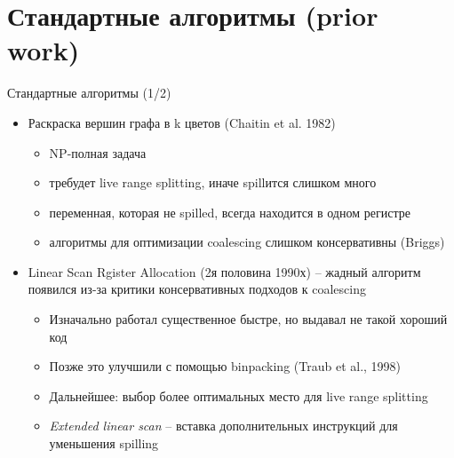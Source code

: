 \documentclass[aspectratio=169
  , xcolor={svgnames}
  , hyperref={ colorlinks,citecolor=DeepPink4
             , linkcolor=DarkRed,urlcolor=DarkBlue}
  , russian
  ]{beamer}
\theoremstyle{exerciseStyle1}
\begin{document}

\section{Стандартные алгоритмы (prior work)} 


\begin{frame}{Стандартные алгоритмы (1/2)}
\begin{itemize}
\item Раскраска вершин графа в k цветов (Chaitin et al. 1982)
\begin{itemize}
\item NP-полная задача
\item требудет live range splitting, иначе spillится слишком много
\item переменная, которая не spilled, всегда находится в одном регистре
\item алгоритмы для оптимизации coalescing слишком консервативны (Briggs)
\end{itemize}

\item Linear Scan Rgister Allocation (2я половина 1990х) -- жадный алгоритм\\
  появился из-за критики консервативных подходов к coalescing
\begin{itemize}
\item Изначально работал существенное быстре, но выдавал не такой хороший код
\item Позже это улучшили с помощью binpacking (Traub et al., 1998)
\item Дальнейшее: выбор более оптимальных место для live range splitting
\item \emph{Extended linear scan} -- вставка дополнительных инструкций для уменьшения spilling
\end{itemize}\end{itemize}
\end{frame}
\end{document}
